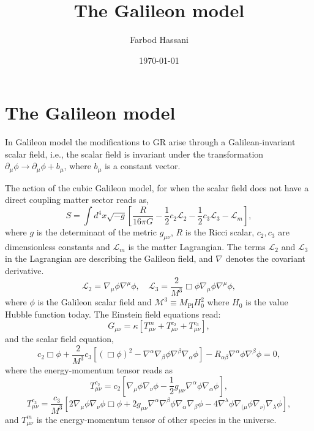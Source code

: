 \documentclass{article}
\title{The Galileon model}
\author{Farbod Hassani}
\date{\today}
\def\be{\begin{equation}}
\def\ee{\end{equation}}
\begin{document}
\maketitle 

\section{The Galileon model}
In Galileon model  the modifications to GR arise through a
Galilean-invariant scalar field, i.e., the scalar field is invariant under the
transformation $\partial_{\mu} \phi \to \partial_{\mu} \phi + b_{\mu}$, where $b_{\mu}$ is a constant vector.

The action of the cubic Galileon model, for when the scalar field does not have a direct coupling matter sector reads as,
\be
S = \int d^4x \sqrt{-g} \left[ \frac{R}{16\pi G} - \frac{1}{2}c_2\mathcal{L}_2 - \frac{1}{2}c_3\mathcal{L}_3 - \mathcal{L}_m \right],
\ee
where $g$ is the determinant of the metric $g_{\mu \nu}$, $R$ is the Ricci scalar, $c_2, c_3$ are dimensionless constants and $\mathcal{L}_m$ is the matter Lagrangian. The terms $\mathcal{L}_2$ and $\mathcal{L}_3$ in the Lagrangian are describing the Galileon field, and $\nabla$ denotes the covariant derivative.
\be
\mathcal{L}_2 = \nabla_\mu \phi \nabla^\mu \phi, \quad \mathcal{L}_3 = \frac{2}{M^3} \Box \phi \nabla_\mu \phi \nabla^\mu \phi,
\ee
where $\phi$ is the Galileon scalar field and $\mathcal{M}^3 \equiv M_{\mathrm{Pl}} H_0^2$ where $H_0$ is the value Hubble function today.
The Einstein field equations read:
\begin{equation}
G_{\mu\nu} = \kappa \left[ T_{\mu\nu}^m + T_{\mu\nu}^{c_2} + T_{\mu\nu}^{c_3} \right],
\end{equation}
 and the scalar field equation,
\begin{equation}
c_2 \Box \phi + \frac{2}{M^3} c_3 \left[ (\Box \phi)^2 - \nabla^\alpha \nabla_\beta \phi \nabla^\beta \nabla_\alpha \phi \right] - R_{\alpha\beta} \nabla^\alpha \phi \nabla^\beta \phi = 0,
\end{equation}
where the energy-momentum tensor reads as 
\begin{equation}
T_{\mu\nu}^{c_2} = c_2 \left[ \nabla_\mu \phi \nabla_\nu \phi - \frac{1}{2} g_{\mu\nu} \nabla^\alpha \phi \nabla_\alpha \phi \right],
\end{equation}
\begin{equation}
T_{\mu\nu}^{c_3} = \frac{c_3}{M^3} \left[ 2 \nabla_\mu \phi \nabla_\nu \phi \Box \phi + 2 g_{\mu\nu} \nabla^\alpha \nabla^\beta \phi \nabla_\alpha \nabla_\beta \phi - 4 \nabla^\lambda \phi \nabla_{(\mu} \phi \nabla_{\nu)} \nabla_\lambda \phi \right],
\end{equation}
and $T^m_{\mu \nu}$ is the energy-momentum tensor of other species in the universe.
\end{document}
